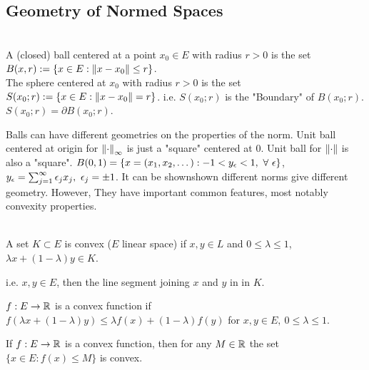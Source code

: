 \subsection{Geometry of Normed Spaces}
\begin{definition}\ \\
A (closed) ball centered at a point $x_0 \in E$ with radius $r > 0$ is the set $B(x,r) := \{x \in E: \norm{x - x_0} \leq r\}$.\\ The sphere centered at $x_0$ with radius $r > 0$ is the set $S(x_0; r) := \{ x \in E: \norm{x - x_0} = r\}$. i.e. $S(x_0;r)$ is the "Boundary" of $B(x_0; r)$. $S(x_0;r) = \partial B(x_0;r)$. 
\end{definition}

\begin{remark}
Balls can have different geometries on the properties of the norm. Unit ball centered at origin for $\norm{\cdot}_\infty$ is just a "square" centered at $0$. Unit ball for $\norm{\cdot}$ is also a "square". $B(0,1) = \{x = (x_1,x_2,\dots): -1 < y_\epsilon < 1,\ \forall\ \epsilon\}$, $y_\epsilon = \sum_{j = 1}^\infty \epsilon_j x_j,\ \epsilon_j = \pm 1$. It can be shownshown different norms give different geometry.
However, They have important common features, most notably convexity properties.
\end{remark}

\begin{definition}\ \\
A set $K \subset E$ is convex ($E$ linear space) if $x,y \in L$ and $0 \leq \lambda \leq 1$, $\lambda x + (1 - \lambda) y \in K$.
\end{definition}
\begin{remark}
i.e. $x,y \in E$, then the line segment joining $x$ and $y$ in in $K$.
\end{remark}

\begin{definition}
$f: E \to \mathbb{R}$ is a convex function if $f(\lambda x + (1 - \lambda)y) \leq \lambda f(x) + (1 - \lambda) f(y)$ for $x,y \in E,\ 0 \leq \lambda \leq 1$.
\end{definition}
\begin{remark}
If $f: E \to \mathbb{R}$ is a convex function, then for any $M \in \mathbb{R}$ the set $\{x \in E: f(x) \leq M\}$ is convex.
\end{remark}

